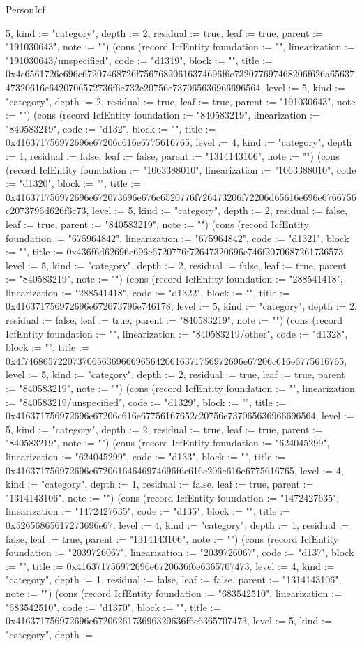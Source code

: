 \begin{lexlean}{PersonIcf}
\begin{semanticmodule}
{5, kind := "category", depth := 2, residual := true, leaf := true, parent := "191030643", note := ""}) (cons (record IcfEntity {foundation := "", linearization := "191030643/unspecified", code := "d1319", block := "", title := 0x4c6561726e696e67207468726f75676820616374696f6e732077697468206f626a6563747320616e6420706572736f6e732c20756e737065636966696564, level := 5, kind := "category", depth := 2, residual := true, leaf := true, parent := "191030643", note := ""}) (cons (record IcfEntity {foundation := "840583219", linearization := "840583219", code := "d132", block := "", title := 0x416371756972696e67206c616e6775616765, level := 4, kind := "category", depth := 1, residual := false, leaf := false, parent := "1314143106", note := ""}) (cons (record IcfEntity {foundation := "1063388010", linearization := "1063388010", code := "d1320", block := "", title := 0x416371756972696e672073696e676c6520776f726473206f72206d65616e696e6766756c2073796d626f6c73, level := 5, kind := "category", depth := 2, residual := false, leaf := true, parent := "840583219", note := ""}) (cons (record IcfEntity {foundation := "675964842", linearization := "675964842", code := "d1321", block := "", title := 0x436f6d62696e696e6720776f72647320696e746f2070687261736573, level := 5, kind := "category", depth := 2, residual := false, leaf := true, parent := "840583219", note := ""}) (cons (record IcfEntity {foundation := "288541418", linearization := "288541418", code := "d1322", block := "", title := 0x416371756972696e672073796e746178, level := 5, kind := "category", depth := 2, residual := false, leaf := true, parent := "840583219", note := ""}) (cons (record IcfEntity {foundation := "", linearization := "840583219/other", code := "d1328", block := "", title := 0x4f746865722073706563696669656420616371756972696e67206c616e6775616765, level := 5, kind := "category", depth := 2, residual := true, leaf := true, parent := "840583219", note := ""}) (cons (record IcfEntity {foundation := "", linearization := "840583219/unspecified", code := "d1329", block := "", title := 0x416371756972696e67206c616e67756167652c20756e737065636966696564, level := 5, kind := "category", depth := 2, residual := true, leaf := true, parent := "840583219", note := ""}) (cons (record IcfEntity {foundation := "624045299", linearization := "624045299", code := "d133", block := "", title := 0x416371756972696e67206164646974696f6e616c206c616e6775616765, level := 4, kind := "category", depth := 1, residual := false, leaf := true, parent := "1314143106", note := ""}) (cons (record IcfEntity {foundation := "1472427635", linearization := "1472427635", code := "d135", block := "", title := 0x52656865617273696e67, level := 4, kind := "category", depth := 1, residual := false, leaf := true, parent := "1314143106", note := ""}) (cons (record IcfEntity {foundation := "2039726067", linearization := "2039726067", code := "d137", block := "", title := 0x416371756972696e6720636f6e6365707473, level := 4, kind := "category", depth := 1, residual := false, leaf := false, parent := "1314143106", note := ""}) (cons (record IcfEntity {foundation := "683542510", linearization := "683542510", code := "d1370", block := "", title := 0x416371756972696e6720626173696320636f6e6365707473, level := 5, kind := "category", depth := }
\end{semanticmodule}
\end{lexlean}
